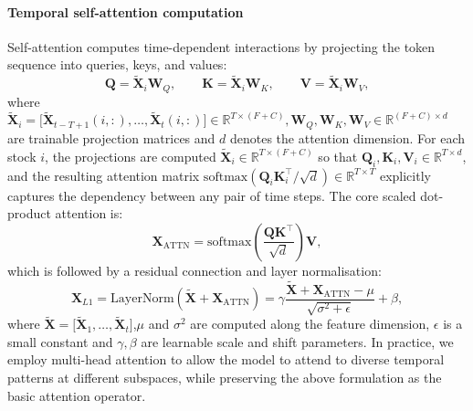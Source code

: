 \documentclass[pdflatex,sn-mathphys-num]{sn-jnl}%
\theoremstyle{thmstyleone}%
\theoremstyle{thmstyletwo}%
\theoremstyle{thmstylethree}%
\begin{document}
\paragraph{Temporal self-attention computation}
Self-attention computes time-dependent interactions by projecting the token sequence into queries, keys, and values:
\begin{equation}
\mathbf{Q}=\tilde{\mathbf{X}}_{i}\mathbf{W}_{Q},\qquad
\mathbf{K}=\tilde{\mathbf{X}}_{i}\mathbf{W}_{K},\qquad
\mathbf{V}=\tilde{\mathbf{X}}_{i}\mathbf{W}_{V},
\label{eq:qkv}
\end{equation}
where $
\tilde{\mathbf X}_{i}
=
\big[\tilde{\mathbf X}_{t-T+1}(i,:),\ldots,\tilde{\mathbf X}_{t}(i,:)\big]
\in\mathbb R^{T\times(F+C)}
,\mathbf{W}_{Q},\mathbf{W}_{K},\mathbf{W}_{V}\in\mathbb{R}^{(F+C)\times d}$ are trainable projection matrices and $d$ denotes the attention dimension. 
For each stock $i$, the projections are computed $\tilde{\mathbf{X}}_{i}\in\mathbb{R}^{T\times(F+C)}$ so that
$\mathbf{Q}_{i},\mathbf{K}_{i},\mathbf{V}_{i}\in\mathbb{R}^{T\times d}$, and the resulting attention matrix
$\mathrm{softmax}(\mathbf{Q}_{i}\mathbf{K}_{i}^{\top}/\sqrt{d})\in\mathbb{R}^{T\times T}$ explicitly captures the dependency between any pair of time steps. 
The core scaled dot-product attention is:
\begin{equation}
\mathbf{X}_{\mathrm{ATTN}}
=
\mathrm{softmax}\!\left(\frac{\mathbf{Q}\mathbf{K}^{\top}}{\sqrt{d}}\right)\mathbf{V},
\label{eq:attn}
\end{equation}
which is followed by a residual connection and layer normalisation:
\begin{equation}
\mathbf{X}_{L1}
=
\mathrm{LayerNorm}\!\left(\tilde{\mathbf{X}}+\mathbf{X}_{\mathrm{ATTN}}\right)
=
\gamma\frac{\tilde{\mathbf{X}}+\mathbf{X}_{\mathrm{ATTN}}-\mu}{\sqrt{\sigma^{2}+\epsilon}}+\beta,
\label{eq:ln1}
\end{equation}
where $
\tilde{\mathbf X}
=
\big[\tilde{\mathbf X}_{1},\ldots,\tilde{\mathbf X}_{t}\big]
$,$\mu$ and $\sigma^{2}$ are computed along the feature dimension, $\epsilon$ is a small constant and $\gamma,\beta$ are learnable scale and shift parameters. 
In practice, we employ multi-head attention to allow the model to attend to diverse temporal patterns at different subspaces, while preserving the above formulation as the basic attention operator.
\end{document}
